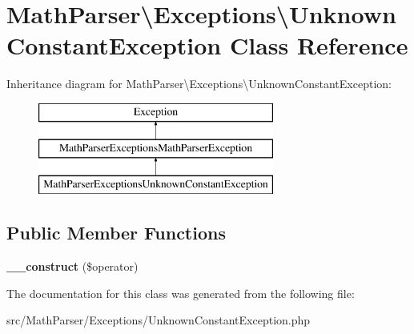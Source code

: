 \hypertarget{classMathParser_1_1Exceptions_1_1UnknownConstantException}{\section{Math\-Parser\textbackslash{}Exceptions\textbackslash{}Unknown\-Constant\-Exception Class Reference}
\label{classMathParser_1_1Exceptions_1_1UnknownConstantException}
}
Inheritance diagram for Math\-Parser\textbackslash{}Exceptions\textbackslash{}Unknown\-Constant\-Exception\-:\begin{figure}[H]
\begin{center}
\leavevmode
\includegraphics[height=3.000000cm]{classMathParser_1_1Exceptions_1_1UnknownConstantException}
\end{center}
\end{figure}
\subsection*{Public Member Functions}
\begin{DoxyCompactItemize}
\item 
\hypertarget{classMathParser_1_1Exceptions_1_1UnknownConstantException_aaadb7ff0441def32ad66957aa5f3053b}{{\bfseries \-\_\-\-\_\-construct} (\$operator)}\label{classMathParser_1_1Exceptions_1_1UnknownConstantException_aaadb7ff0441def32ad66957aa5f3053b}

\end{DoxyCompactItemize}


The documentation for this class was generated from the following file\-:\begin{DoxyCompactItemize}
\item 
src/\-Math\-Parser/\-Exceptions/Unknown\-Constant\-Exception.\-php\end{DoxyCompactItemize}
